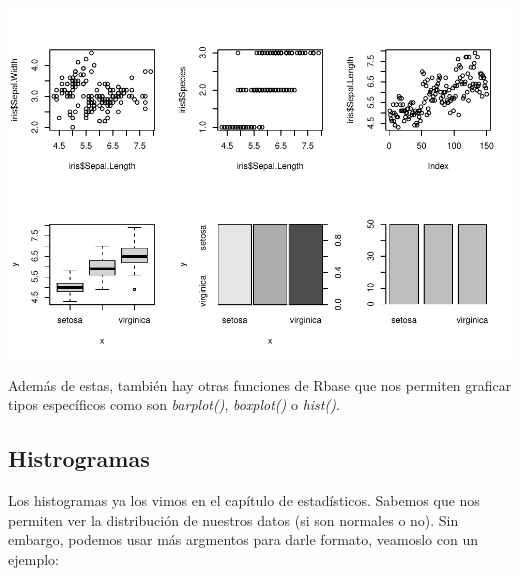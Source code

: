 \documentclass[
]{book}
\newenvironment{Shaded}{\begin{snugshade}}{\end{snugshade}}
\newcommand{\AttributeTok}[1]{\textcolor[rgb]{0.13,0.29,0.53}{#1}}
\newcommand{\FunctionTok}[1]{\textcolor[rgb]{0.13,0.29,0.53}{\textbf{#1}}}
\newcommand{\NormalTok}[1]{#1}
\newcommand{\SpecialCharTok}[1]{\textcolor[rgb]{0.81,0.36,0.00}{\textbf{#1}}}
\newcommand{\StringTok}[1]{\textcolor[rgb]{0.31,0.60,0.02}{#1}}
\begin{document}
\hfill\break

\begin{center}\includegraphics{_main_files/figure-latex/unnamed-chunk-190-1} \end{center}

\hfill\break

Además de estas, también hay otras funciones de Rbase que nos permiten graficar tipos específicos como son \emph{barplot()}, \emph{boxplot()} o \emph{hist()}.

\hfill\break

\subsection{Histrogramas}\label{histrogramas}

Los histogramas ya los vimos en el capítulo de estadísticos.
Sabemos que nos permiten ver la distribución de nuestros datos (si son normales o no).
Sin embargo, podemos usar más argmentos para darle formato, veamoslo con un ejemplo:

\begin{Shaded}
\end{Shaded}
\end{document}
